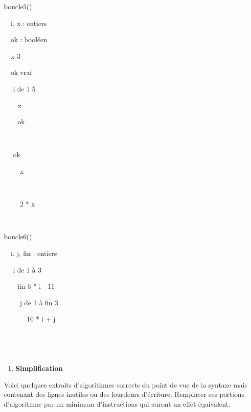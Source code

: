 {\sffamily
{} }


\bigskip

{\sffamily
{} boucle5()}

{\sffamily
\ \ i, x : entiers}

{\sffamily
\ \ ok : booléen}

{\sffamily
\texttt{\ \ }x  3}

{\sffamily
\ \ ok  vrai}

{\sffamily
\ \  i de 1  5
}

{\sffamily
{\texttt{\ \ }}{\ \ x
}}

{\sffamily
{\ \ \ \ ok
}}

{\sffamily
\ \ }

{\sffamily
\ \  ok }

{\sffamily
\ \ \ \  x}

{\sffamily
\ \ }

{\sffamily
\ \ \ \  2 * x}

{\sffamily
\ \ }

{\sffamily
{} }


\bigskip

{\sffamily
{} boucle6()}

{\sffamily
\ \ i, j, fin : entiers}

{\sffamily
\ \  i de 1 à 3 }

{\sffamily
\ \ \ \ fin  6 * i - 11}

{\sffamily
\ \ \ \  j de 1 à fin  3
 }

{\sffamily
\ \ \ \ \ \  10 * i +
j}

{\sffamily
{\ \ \ \ } \ \ \ \ \ }

{\sffamily
\ \ }

{\sffamily
{}}


\bigskip

\liststyleExercice
\setcounter{saveenum}{\value{enumi}}
\begin{enumerate}
\setcounter{enumi}{\value{saveenum}}
\item {\sffamily\bfseries
Simplification}
\end{enumerate}
{
Voici quelques extraits d’algorithmes corrects du point de vue de la
syntaxe mais contenant des lignes inutiles ou des lourdeurs d’écriture.
Remplacer ces portions d’algorithme par un minimum d’instructions qui
auront un effet équivalent.}

